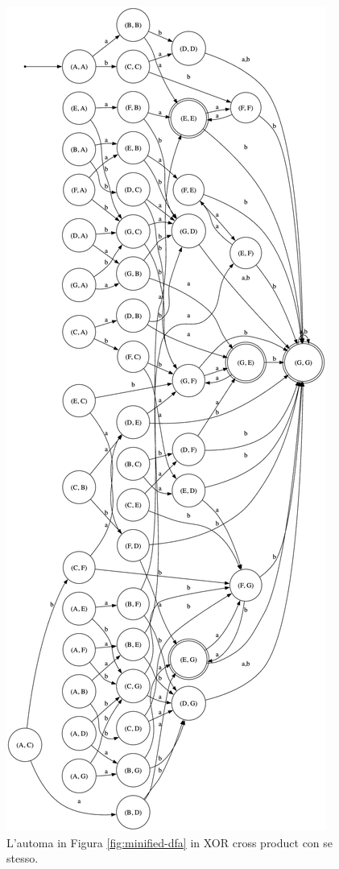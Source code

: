 \documentclass[a4paper,12pt]{report} %
\begin{document}
\begin{figure}
  \centering
  \includegraphics[width=0.5\linewidth]{images/dfa_xcp.png}
  \caption{\label{fig:dfa-xcp}L'automa in Figura \ref{fig:minified-dfa} in XOR cross product con se stesso.}
\end{figure}
\end{document}

